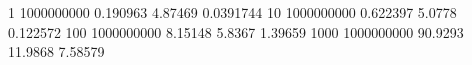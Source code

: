 1 1000000000 0.190963 4.87469 0.0391744
10 1000000000 0.622397 5.0778 0.122572
100 1000000000 8.15148 5.8367 1.39659
1000 1000000000 90.9293 11.9868 7.58579

